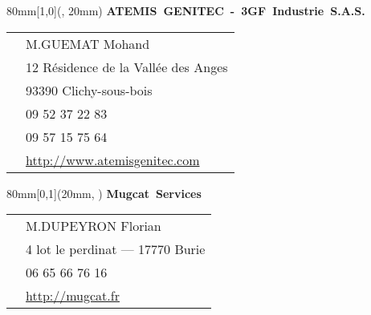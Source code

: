 
\clearpage
\null

\pagestyle{empty}
\setlength{\parindent}{0mm}
\hypersetup{
    hidelinks
}



\begin{textblock*}{80mm}[1,0](\paperwidth-20mm, 20mm)
    \mbox{\bfseries ATEMIS GENITEC - 3GF Industrie S.A.S.}

    \begin{tabular}{l l }
        \fa{} & M.GUEMAT Mohand \\
        \fa{} & 12 Résidence de la Vallée des Anges \\
               & 93390 Clichy-sous-bois \\
        \fa{} & 09 52 37 22 83 \\
        \fa{} & 09 57 15 75 64 \\
        \fa{} & \url{http://www.atemisgenitec.com}
    \end{tabular}
\end{textblock*}

\begin{textblock*}{80mm}[0,1](20mm, \paperheight-20mm)
    \color{white}\mbox{\bfseries Mugcat Services}

    \begin{tabular}{l l }
        \fa{} & M.DUPEYRON Florian \\
        \fa{} & 4 lot le perdinat --- 17770 Burie \\
        \fa{} & 06 65 66 76 16 \\
        \fa{} & \url{http://mugcat.fr}
    \end{tabular}
\end{textblock*}

\clearpage
